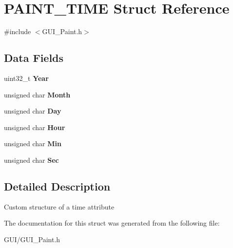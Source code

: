 \hypertarget{struct_p_a_i_n_t___t_i_m_e}{}\section{P\+A\+I\+N\+T\+\_\+\+T\+I\+ME Struct Reference}
\label{struct_p_a_i_n_t___t_i_m_e}


{\ttfamily \#include $<$G\+U\+I\+\_\+\+Paint.\+h$>$}

\subsection*{Data Fields}
\begin{DoxyCompactItemize}
\item 
\mbox{\label{struct_p_a_i_n_t___t_i_m_e_a005ca34a2aa55d22797b99e02244d852}} 
uint32\+\_\+t {\bfseries Year}
\item 
\mbox{\label{struct_p_a_i_n_t___t_i_m_e_a47fbf139f673da3a34bfbd9714895f8f}} 
unsigned char {\bfseries Month}
\item 
\mbox{\label{struct_p_a_i_n_t___t_i_m_e_af7f79d94bfdb7a238a4ccb25de73ca8a}} 
unsigned char {\bfseries Day}
\item 
\mbox{\label{struct_p_a_i_n_t___t_i_m_e_a59fec9c399e7dcb45a05c1b3ac680b20}} 
unsigned char {\bfseries Hour}
\item 
\mbox{\label{struct_p_a_i_n_t___t_i_m_e_afb74a43fc02ec7c6a8d2e96fea6e84b2}} 
unsigned char {\bfseries Min}
\item 
\mbox{\label{struct_p_a_i_n_t___t_i_m_e_ab1006ac2796f980faeb87acf4cdc1761}} 
unsigned char {\bfseries Sec}
\end{DoxyCompactItemize}


\subsection{Detailed Description}
Custom structure of a time attribute 

The documentation for this struct was generated from the following file\+:\begin{DoxyCompactItemize}
\item 
G\+U\+I/G\+U\+I\+\_\+\+Paint.\+h\end{DoxyCompactItemize}
